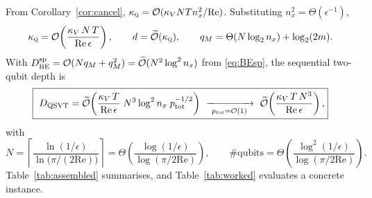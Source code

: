 \documentclass[11pt,a4paper]{article}
\theoremstyle{plain}
\theoremstyle{definition}
\theoremstyle{remark}
\newcommand{\Rey}{\mathrm{Re}}
\newcommand{\Oh}{\mathcal{O}}
\newcommand{\Ot}{\widetilde{\mathcal{O}}}
\newcommand{\kQ}{\kappa_{\textsc{q}}}
\begin{document}
From Corollary~\ref{cor:cancel}, $\kQ=\Oh(\kappa_V NTn_x^2/\Rey)$.  Substituting
$n_x^2=\Theta(\epsilon^{-1})$,
\begin{equation}
\kQ=\Oh\!\left(\frac{\kappa_V\,N\,T}{\Rey\,\epsilon}\right),
\qquad
d=\Ot(\kQ),
\qquad
q_M=\Theta(N\log_2 n_x)+\log_2(2m).
\end{equation}
With $D^{\rm sp}_{\rm BE}=\Oh(Nq_M+q_M^2)=\Ot(N^2\log^2 n_x)$ from
\eqref{eq:BEsp}, the sequential two-qubit depth is
\begin{equation}
\boxed{\
D_{\rm QSVT}
=\Ot\!\left(\frac{\kappa_V\,T}{\Rey\,\epsilon}\;N^{3}\log^{2}n_x\;
p_{\rm tot}^{-1/2}\right)
\ \xrightarrow[\ p_{\rm tot}=\Oh(1)\ ]{}\
\Ot\!\left(\frac{\kappa_V\,T\,N^{3}}{\Rey\,\epsilon}\right),}
\label{eq:finaldepth}
\end{equation}
with
\begin{equation}
N=\left\lceil\frac{\ln(1/\epsilon)}{\ln\bigl(\pi/(2\Rey)\bigr)}\right\rceil
=\Theta\!\left(\frac{\log(1/\epsilon)}{\log(\pi/2\Rey)}\right),
\qquad
\#\text{qubits}=\Theta\!\left(\frac{\log^{2}(1/\epsilon)}{\log(\pi/2\Rey)}\right).
\label{eq:finalqubits}
\end{equation}
Table~\ref{tab:assembled} summarises, and Table~\ref{tab:worked} evaluates a
concrete instance.
\end{document}
